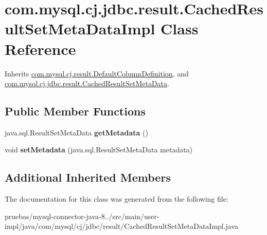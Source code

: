 \hypertarget{classcom_1_1mysql_1_1cj_1_1jdbc_1_1result_1_1_cached_result_set_meta_data_impl}{}\section{com.\+mysql.\+cj.\+jdbc.\+result.\+Cached\+Result\+Set\+Meta\+Data\+Impl Class Reference}
\label{classcom_1_1mysql_1_1cj_1_1jdbc_1_1result_1_1_cached_result_set_meta_data_impl}


Inherits \mbox{\hyperlink{classcom_1_1mysql_1_1cj_1_1result_1_1_default_column_definition}{com.\+mysql.\+cj.\+result.\+Default\+Column\+Definition}}, and \mbox{\hyperlink{interfacecom_1_1mysql_1_1cj_1_1jdbc_1_1result_1_1_cached_result_set_meta_data}{com.\+mysql.\+cj.\+jdbc.\+result.\+Cached\+Result\+Set\+Meta\+Data}}.

\subsection*{Public Member Functions}
\begin{DoxyCompactItemize}
\item 
\mbox{\label{classcom_1_1mysql_1_1cj_1_1jdbc_1_1result_1_1_cached_result_set_meta_data_impl_ad340a766600a4dd265fcd87df0e85b78}} 
java.\+sql.\+Result\+Set\+Meta\+Data {\bfseries get\+Metadata} ()
\item 
\mbox{\label{classcom_1_1mysql_1_1cj_1_1jdbc_1_1result_1_1_cached_result_set_meta_data_impl_ae5fdc22b3e94b8fd950721c1c8fea867}} 
void {\bfseries set\+Metadata} (java.\+sql.\+Result\+Set\+Meta\+Data metadata)
\end{DoxyCompactItemize}
\subsection*{Additional Inherited Members}


The documentation for this class was generated from the following file\+:\begin{DoxyCompactItemize}
\item 
pruebas/mysql-\/connector-\/java-\/8../src/main/user-\/impl/java/com/mysql/cj/jdbc/result/Cached\+Result\+Set\+Meta\+Data\+Impl.\+java\end{DoxyCompactItemize}
